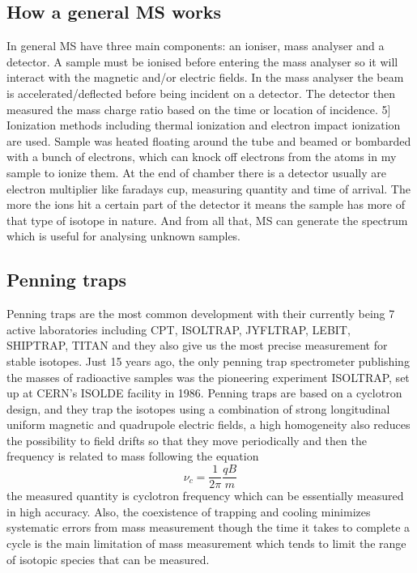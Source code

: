 \subsection{How a general MS works}
In general MS have three main components: an ioniser, mass analyser and a detector.
A sample must be ionised before entering the mass analyser so it will interact with the magnetic and/or electric fields.
In the mass analyser the beam is accelerated/deflected before being incident on a detector.
The detector then measured the mass charge ratio based on the time or location of incidence.
5] Ionization methods including thermal ionization and electron impact ionization are used.
Sample was heated floating around the tube and beamed or bombarded with a bunch of electrons, which can knock off electrons from the atoms in my sample to ionize them.
At the end of chamber there is a detector usually are electron multiplier like faradays cup, measuring quantity and time of arrival.
The more the ions hit a certain part of the detector it means the sample has more of that type of isotope in nature.
And from all that, MS can generate the spectrum which is useful for analysing unknown samples.

\subsection{Penning traps}
Penning traps are the most common development with their currently being 7 active laboratories including CPT, ISOLTRAP, JYFLTRAP, LEBIT, SHIPTRAP, TITAN and they also give us the most precise measurement for stable isotopes.
Just 15 years ago, the only penning trap spectrometer publishing the masses of radioactive samples was the pioneering experiment ISOLTRAP, set up at CERN’s ISOLDE facility in 1986.
Penning traps are based on a cyclotron design, and they trap the isotopes using a combination of strong longitudinal uniform magnetic and quadrupole electric fields, a high homogeneity also reduces the possibility to field drifts so that they move periodically and then the frequency is related to mass following the equation
\begin{equation}
    \nu_c = \frac{1}{2\pi}\frac{qB}{m}
\end{equation}
the measured quantity is cyclotron frequency which can be essentially measured in high accuracy.
Also, the coexistence of trapping and cooling minimizes systematic errors from mass measurement though the time it takes to complete a cycle is the main limitation of mass measurement which tends to limit the range of isotopic species that can be measured.

